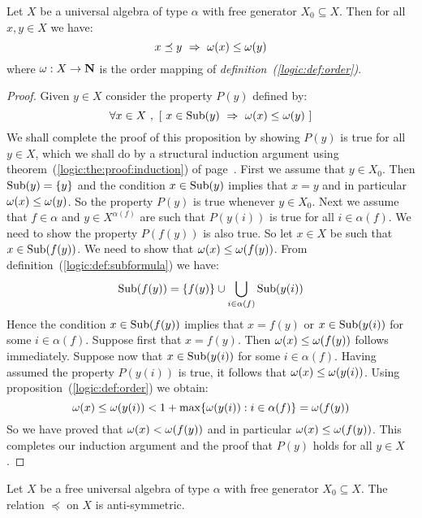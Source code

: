 \begin{prop}\label{logic:prop:subformula:order}
Let $X$ be a universal algebra of type $\alpha$ with free generator
$X_{0}\subseteq X$. Then for all $x,y\in X$ we have:
    \[
    x\preceq y\ \Rightarrow\ \om(x)\leq\om(y)
    \]
where $\mbox{$\omega$}:X\to\mbox{$\bf N$}$ is the order mapping of {\em
definition~(\ref{logic:def:order})}.
\end{prop}
\begin{proof}
Given $y\in X$ consider the property $P(y)$ defined by:
    \[
    \forall x\in X\ ,\ [\ x\in\subf(y)\ \Rightarrow\
    \om(x)\leq\om(y)\ ]
    \]
We shall complete the proof of this proposition by showing $P(y)$ is
true for all $y\in X$, which we shall do by a structural induction
argument using theorem~(\ref{logic:the:proof:induction}) of
page~\pageref{logic:the:proof:induction}. First we assume that $y\in
X_{0}$. Then $\mbox{\rm Sub}(y)=\{y\}$ and the condition $x\in\mbox{\rm Sub}(y)$
implies that $x=y$ and in particular $\mbox{$\omega$}(x)\leq\mbox{$\omega$}(y)$. So the
property $P(y)$ is true whenever $y\in X_{0}$. Next we assume that
$f\in\alpha$ and $y\in X^{\alpha(f)}$ are such that $P(y(i))$ is
true for all $i\in\alpha(f)$. We need to show the property $P(f(y))$
is also true. So let $x\in X$ be such that $x\in\mbox{\rm Sub}(f(y))$. We
need to show that $\mbox{$\omega$}(x)\leq\mbox{$\omega$}(f(y))$. From
definition~(\ref{logic:def:subformula}) we have:
   \[
    \mbox{\rm Sub}(f(y)) =
    \{f(y)\}\cup\bigcup_{i\in\alpha(f)}\mbox{\rm Sub}(y(i))
    \]
Hence the condition $x\in\mbox{\rm Sub}(f(y))$ implies that $x=f(y)$ or
$x\in\mbox{\rm Sub}(y(i))$ for some $i\in\alpha(f)$. Suppose first that
$x=f(y)$. Then $\mbox{$\omega$}(x)\leq\mbox{$\omega$}(f(y))$ follows immediately. Suppose
now that $x\in\mbox{\rm Sub}(y(i))$ for some $i\in\alpha(f)$. Having assumed
the property $P(y(i))$ is true, it follows that
$\mbox{$\omega$}(x)\leq\mbox{$\omega$}(y(i))$. Using proposition~(\ref{logic:def:order}) we
obtain:
    \[
    \mbox{$\omega$}(x)\leq\mbox{$\omega$}(y(i))<1 +
    \max\{\mbox{$\omega$}(y(i)):i\in\alpha(f)\}=\mbox{$\omega$}(f(y))
    \]
So we have proved that $\mbox{$\omega$}(x)<\mbox{$\omega$}(f(y))$ and in particular
$\mbox{$\omega$}(x)\leq\mbox{$\omega$}(f(y))$. This completes our induction argument and the
proof that $P(y)$ holds for all $y\in X$.
\end{proof}
\begin{prop}\label{logic:prop:subformula:antisymmetric}
Let $X$ be a free universal algebra of type $\alpha$ with free
generator $X_{0}\subseteq X$. The relation $\preceq$ on $X$ is
anti-symmetric.
\end{prop}

